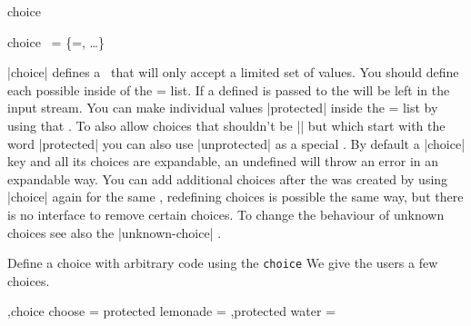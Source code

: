 \begin{function}[module=expkv-def type]{choice}
  \begin{syntax}
    choice \key\ = \{\val=, \ldots\} 
  \end{syntax}
  |choice| defines a \Vkey\ that will only accept a limited set of values. You
  should define each possible  inside of the \val=
  list. If a defined  is passed to  the 
  will be left in the input stream. You can make individual values |protected|
  inside the \val= list by using that \prefix. To also allow
  choices that shouldn't be |\protected| but which start with the word
  |protected| you can also use |unprotected| as a special \prefix. By default a
  |choice| key and all its choices are expandable, an undefined 
  will throw an error in an expandable way. You can add additional choices after
  the  was created by using |choice| again for the same \key,
  redefining choices is possible the same way, but there is no interface to
  remove certain choices. To change the behaviour of unknown choices see also
  the |unknown-choice| \type.
\end{function}
\begin{example}
    {Define a choice with arbitrary code using the \texttt{choice} \type}
  We give the users a few choices.
  \begin{enverb}
        ,choice choose =
          {
             protected lemonade = \def\exampledrink{something sour}
            ,protected water = \def\exampledrink{something boring}
          }
  \end{enverb}
\end{example}


